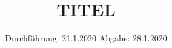 

\subject{VERSUCH NUMMER}
\title{TITEL}
\date{%
  Durchführung: 21.1.2020
  \hspace{3em}
  Abgabe: 28.1.2020
}


\setlength{\parindent}{0pt} %

\maketitle
\thispagestyle{empty}
\tableofcontents
\newpage







\printbibliography{}


